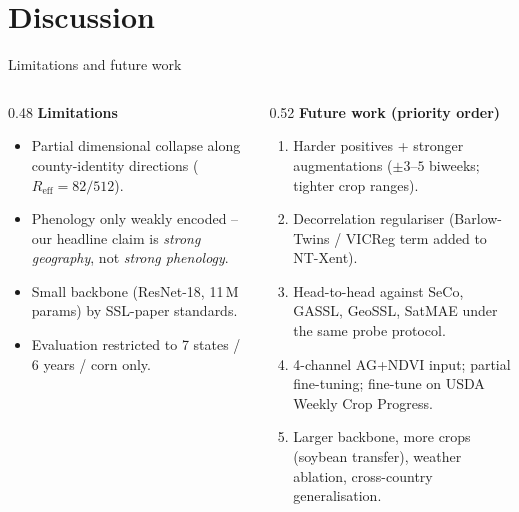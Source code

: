 \documentclass[aspectratio=169,11pt]{beamer}
\begin{document}
\section{Discussion}
\begin{frame}{Limitations and future work}
  \begin{columns}[T]
    \begin{column}{0.48\textwidth}
      \textbf{Limitations}
      \begin{itemize}\small\setlength\itemsep{3pt}
        \item Partial dimensional collapse along county-identity directions
              ($R_{\mathrm{eff}}\!=\!82/512$).
        \item Phenology only weakly encoded -- our headline claim is
              \emph{strong geography}, not \emph{strong phenology}.
        \item Small backbone (ResNet-18, 11\,M params) by SSL-paper standards.
        \item Evaluation restricted to 7 states / 6 years / corn only.
      \end{itemize}
    \end{column}
    \begin{column}{0.52\textwidth}
      \textbf{Future work (priority order)}
      \begin{enumerate}\small\setlength\itemsep{3pt}
        \item \alert{Harder positives + stronger augmentations}
              ($\pm 3$--$5$ biweeks; tighter crop ranges).
        \item \alert{Decorrelation regulariser} (Barlow-Twins / VICReg term
              added to NT-Xent).
        \item Head-to-head against SeCo, GASSL, GeoSSL, SatMAE under the same
              probe protocol.
        \item 4-channel AG+NDVI input;\; partial fine-tuning;\;
              fine-tune on USDA Weekly Crop Progress.
        \item Larger backbone, more crops (soybean transfer), weather ablation,
              cross-country generalisation.
      \end{enumerate}
    \end{column}
  \end{columns}
\end{frame}
\end{document}
